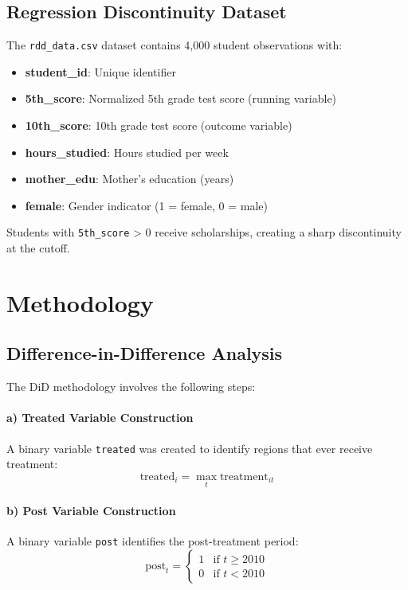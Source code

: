 \documentclass[a4paper,12pt,headsepline]{scrartcl} %
\begin{document}
\subsection{Regression Discontinuity Dataset}
The \texttt{rdd\_data.csv} dataset contains 4,000 student observations with:
\begin{itemize}
    \item \textbf{student\_id}: Unique identifier
    \item \textbf{5th\_score}: Normalized 5th grade test score (running variable)
    \item \textbf{10th\_score}: 10th grade test score (outcome variable)
    \item \textbf{hours\_studied}: Hours studied per week
    \item \textbf{mother\_edu}: Mother's education (years)
    \item \textbf{female}: Gender indicator (1 = female, 0 = male)
\end{itemize}

Students with \texttt{5th\_score} > 0 receive scholarships, creating a sharp discontinuity at the cutoff.

\section{Methodology}

\subsection{Difference-in-Difference Analysis}

The DiD methodology involves the following steps:

\paragraph{a) Treated Variable Construction}
A binary variable \texttt{treated} was created to identify regions that ever receive treatment:
\begin{equation}
\text{treated}_i = \max_{t} \text{treatment}_{it}
\end{equation}

\paragraph{b) Post Variable Construction}
A binary variable \texttt{post} identifies the post-treatment period:
\begin{equation}
\text{post}_t = 
\begin{cases}
1 & \text{if } t \geq 2010 \\
0 & \text{if } t < 2010
\end{cases}
\end{equation}
\end{document}
